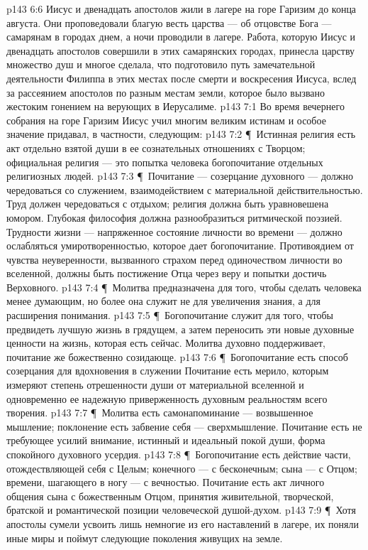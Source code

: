 \vs p143 6:6 Иисус и двенадцать апостолов жили в лагере на горе Гаризим до конца августа. Они проповедовали благую весть царства --- об отцовстве Бога --- самарянам в городах днем, а ночи проводили в лагере. Работа, которую Иисус и двенадцать апостолов совершили в этих самарянских городах, принесла царству множество душ и многое сделала, что подготовило путь замечательной деятельности Филиппа в этих местах после смерти и воскресения Иисуса, вслед за рассеянием апостолов по разным местам земли, которое было вызвано жестоким гонением на верующих в Иерусалиме.
\vs p143 7:1 Во время вечернего собрания на горе Гаризим Иисус учил многим великим истинам и особое значение придавал, в частности, следующим:
\vs p143 7:2 \P\ Истинная религия есть акт отдельно взятой души в ее сознательных отношениях с Творцом; официальная религия --- это попытка человека  богопочитание отдельных религиозных людей.
\vs p143 7:3 \P\ Почитание --- созерцание духовного --- должно чередоваться со служением, взаимодействием с материальной действительностью. Труд должен чередоваться с отдыхом; религия должна быть уравновешена юмором. Глубокая философия должна разнообразиться ритмической поэзией. Трудности жизни --- напряженное состояние личности во времени --- должно ослабляться умиротворенностью, которое дает богопочитание. Противоядием от чувства неуверенности, вызванного страхом перед одиночеством личности во вселенной, должны быть постижение Отца через веру и попытки достичь Верховного.
\vs p143 7:4 \P\ Молитва предназначена для того, чтобы сделать человека менее думающим, но более  она служит не для увеличения знания, а для расширения понимания.
\vs p143 7:5 \P\ Богопочитание служит для того, чтобы предвидеть лучшую жизнь в грядущем, а затем переносить эти новые духовные ценности на жизнь, которая есть сейчас. Молитва духовно поддерживает, почитание же божественно созидающе.
\vs p143 7:6 \P\ Богопочитание есть способ созерцания  для вдохновения в служении  Почитание есть мерило, которым измеряют степень отрешенности души от материальной вселенной и одновременно ее надежную приверженность духовным реальностям всего творения.
\vs p143 7:7 \P\ Молитва есть самонапоминание --- возвышенное мышление; поклонение есть забвение себя --- сверхмышление. Почитание есть не требующее усилий внимание, истинный и идеальный покой души, форма спокойного духовного усердия.
\vs p143 7:8 \P\ Богопочитание есть действие части, отождествляющей себя с Целым; конечного --- с бесконечным; сына --- с Отцом; времени, шагающего в ногу --- с вечностью. Почитание есть акт личного общения сына с божественным Отцом, принятия живительной, творческой, братской и романтической позиции человеческой душой\hyp{}духом.
\vs p143 7:9 \P\ Хотя апостолы сумели усвоить лишь немногие из его наставлений в лагере, их поняли иные миры и поймут следующие поколения живущих на земле.
